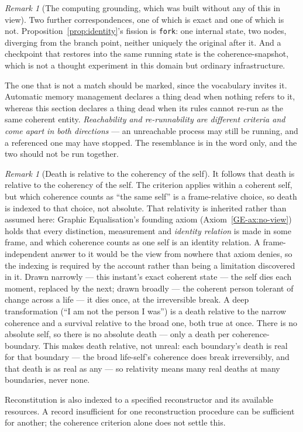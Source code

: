 \documentclass[11pt,a4paper]{article}
\theoremstyle{remark}\newtheorem{remark}[definition]{Remark}
\begin{document}
\begin{remark}[The computing grounding, which was built without any of this in view]
Two further correspondences, one of which is exact and one of which is not.
Proposition~\ref{prop:identity}'s fission is \texttt{fork}: one internal state, two nodes, diverging
from the branch point, neither uniquely the original after it. And a checkpoint that restores into the
same running state is the coherence-snapshot, which is not a thought experiment in this domain but
ordinary infrastructure.

The one that is not a match should be marked, since the vocabulary invites it. Automatic memory
management declares a thing dead when nothing refers to it, whereas this section declares a thing dead
when its rules cannot re-run as the same coherent entity. \emph{Reachability and re-runnability are
different criteria and come apart in both directions} --- an unreachable process may still be running,
and a referenced one may have stopped. The resemblance is in the word only, and the two should not be
run together.
\end{remark}

\begin{remark}[Death is relative to the coherency of the self]\label{rem:death-relative}
It follows that death is relative to the coherency of the self. The criterion applies
within a coherent self, but which coherence counts as ``the same self'' is a
frame-relative choice, so death is indexed to that choice, not absolute. That relativity is
inherited rather than assumed here: Graphic Equalisation's founding axiom
(Axiom~\ref{GE-ax:no-view}) holds that every
distinction, measurement and \emph{identity relation} is made in some frame, and which coherence
counts as one self is an identity relation. A frame-independent answer to it would be the view from
nowhere that axiom denies, so the indexing is required by the account rather than being a limitation
discovered in it. Drawn narrowly
--- this instant's exact coherent state --- the self dies each moment, replaced by the
next; drawn broadly --- the coherent person tolerant of change across a life --- it dies
once, at the irreversible break. A deep transformation (``I am not the person I was'')
is a death relative to the narrow coherence and a survival relative to the broad one,
both true at once. There is no absolute self, so there is no absolute death --- only a
death per coherence-boundary. This makes death relative, not unreal: each boundary's
death is real for that boundary --- the broad life-self's coherence does break
irreversibly, and that death is as real as any --- so relativity means many real deaths
at many boundaries, never none.
\end{remark}
Reconstitution is also indexed to a specified reconstructor and its available
resources. A record insufficient for one reconstruction procedure can be
sufficient for another; the coherence criterion alone does not settle this.
\end{document}
